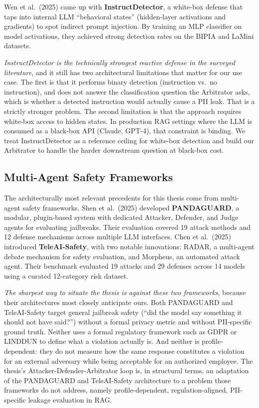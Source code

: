 \documentclass[12pt, a4paper]{report}
\begin{document}
Wen et al.\ (2025) came up with \textbf{InstructDetector}, a white-box defense that taps into internal LLM ``behavioral states'' (hidden-layer activations and gradients) to spot indirect prompt injection. By training an MLP classifier on model activations, they achieved strong detection rates on the BIPIA and LaMini datasets.

\begin{critbox}
\textit{InstructDetector is the technically strongest reactive defense in the surveyed literature}, and it still has two architectural limitations that matter for our use case. The first is that it performs binary detection (instruction vs.\ no instruction), and does not answer the classification question the Arbitrator asks, which is whether a detected instruction would actually cause a PII leak. That is a strictly stronger problem. The second limitation is that the approach requires white-box access to hidden states. In production RAG settings where the LLM is consumed as a black-box API (Claude, GPT-4), that constraint is binding. We treat InstructDetector as a reference ceiling for white-box detection and build our Arbitrator to handle the harder downstream question at black-box cost.
\end{critbox}

\subsection{Multi-Agent Safety Frameworks}

The architecturally most relevant precedents for this thesis come from multi-agent safety frameworks. Shen et al.\ (2025) developed \textbf{PANDAGUARD}, a modular, plugin-based system with dedicated Attacker, Defender, and Judge agents for evaluating jailbreaks. Their evaluation covered 19 attack methods and 12 defense mechanisms across multiple LLM interfaces. Chen et al.\ (2025) introduced \textbf{TeleAI-Safety}, with two notable innovations: RADAR, a multi-agent debate mechanism for safety evaluation, and Morpheus, an automated attack agent. Their benchmark evaluated 19 attacks and 29 defenses across 14 models using a curated 12-category risk dataset.

\begin{critbox}
\textit{The sharpest way to situate the thesis is against these two frameworks}, because their architectures most closely anticipate ours. Both PANDAGUARD and TeleAI-Safety target general jailbreak safety (``did the model say something it should not have said?'') without a formal privacy metric and without PII-specific ground truth. Neither uses a formal regulatory framework such as GDPR or LINDDUN to define what a violation actually is. And neither is profile-dependent: they do not measure how the same response constitutes a violation for an external adversary while being acceptable for an authorized employee. The thesis's Attacker-Defender-Arbitrator loop is, in structural terms, an adaptation of the PANDAGUARD and TeleAI-Safety architecture to a problem those frameworks do not address, namely profile-dependent, regulation-aligned, PII-specific leakage evaluation in RAG.
\end{critbox}
\end{document}
